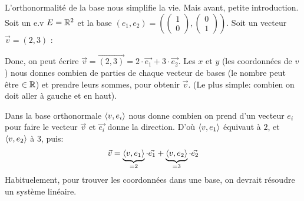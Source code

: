 \begin{intuition}
    L'orthonormalité de la base nous simplifie la vie. Mais avant, petite introduction. Soit un e.v $E = \mathbb{R}^2$ et la base $(e_1, e_2) = (\begin{pmatrix} 1 \\ 0 \end{pmatrix}, \begin{pmatrix} 0\\ 1 \end{pmatrix})$. Soit un vecteur $\vec{v} = (2, 3)$ :
    \begin{center}
    \end{center}
    Donc, on peut écrire $\vec{v} = \vec{(2, 3)} = 2 \cdot \vec{e_1} + 3 \cdot \vec{e_2}$. Les $x$ et  $y$ (les coordonnées de $v$) nous donnes combien de parties de chaque vecteur de bases (le nombre peut être $\in \mathbb{R}$) et prendre leurs sommes, pour obtenir $\vec{v}$. (Le plus simple: combien on doit aller à gauche et en haut).
    \par
    Dans la base orthonormale $\langle v, e_i \rangle$ nous donne combien on prend d'un vecteur $e_i$ pour faire le vecteur  $\vec{v}$ et  $\vec{e_i}$ donne la direction. D'où $\langle v, e_1 \rangle$ équivaut à $2$, et  $\langle v, e_2 \rangle$ à  $3$, puis: 
   \[
       \vec{v} = \underbrace{\langle v, e_1 \rangle}_{= 2} \cdot \vec{e_1} + \underbrace{\langle v, e_2 \rangle}_{= 3} \cdot \vec{e_2}
   \]  
   Habituelement, pour trouver les coordonnées dans une base, on devrait résoudre un système linéaire.
\end{intuition}

